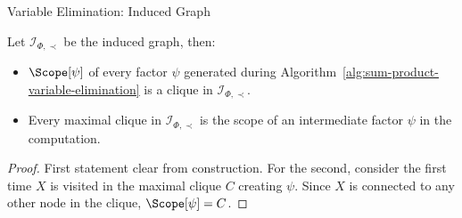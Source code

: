 \begin{frame}{Variable Elimination: Induced Graph}
\begin{minipage}[t]{0.39\textwidth}
\begin{theorem}
Let $\mathcal{I}_{\Phi,\prec}$ be the induced graph, then:
\begin{itemize}
    \item $\Scope[\psi]$ of every factor $\psi$ generated during Algorithm~\ref{alg:sum-product-variable-elimination} is a clique in $\mathcal{I}_{\Phi,\prec}$.
    \item Every maximal clique in $\mathcal{I}_{\Phi,\prec}$ is the scope of an intermediate factor $\psi$ in the computation.
\end{itemize}
\end{theorem}
\pause
\vspace{-0.35cm}
\begin{proof}
First statement clear from construction.
\pause
For the second, consider the first time $X$ is visited in the maximal clique $C$ creating $\psi$.
\pause
Since $X$ is connected to any other node in the clique, $\Scope[\psi] = C$.
\end{proof}
\end{minipage}
\end{frame}

